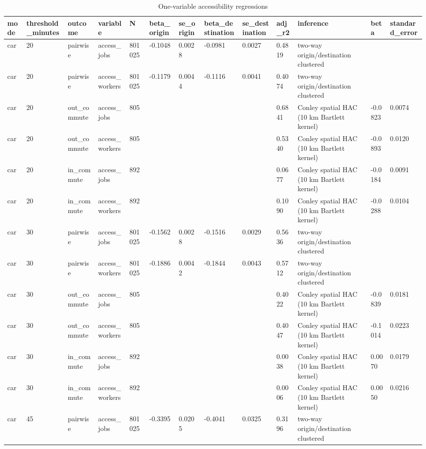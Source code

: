 \begin{table}[htbp]
\centering
\scriptsize
\caption{One-variable accessibility regressions}
\label{tab:onevar}
\begin{tabular}{lllllllllllll}
\toprule
mode & threshold\_minutes & outcome & variable & N & beta\_origin & se\_origin & beta\_destination & se\_destination & adj\_r2 & inference & beta & standard\_error \\
\midrule
car & 20 & pairwise & access\_jobs & 801025 & -0.1048 & 0.0028 & -0.0981 & 0.0027 & 0.4819 & two-way origin/destination clustered &  &  \\
car & 20 & pairwise & access\_workers & 801025 & -0.1179 & 0.0044 & -0.1116 & 0.0041 & 0.4074 & two-way origin/destination clustered &  &  \\
car & 20 & out\_commute & access\_jobs & 805 &  &  &  &  & 0.6841 & Conley spatial HAC (10 km Bartlett kernel) & -0.0823 & 0.0074 \\
car & 20 & out\_commute & access\_workers & 805 &  &  &  &  & 0.5340 & Conley spatial HAC (10 km Bartlett kernel) & -0.0893 & 0.0120 \\
car & 20 & in\_commute & access\_jobs & 892 &  &  &  &  & 0.0677 & Conley spatial HAC (10 km Bartlett kernel) & -0.0184 & 0.0091 \\
car & 20 & in\_commute & access\_workers & 892 &  &  &  &  & 0.1090 & Conley spatial HAC (10 km Bartlett kernel) & -0.0288 & 0.0104 \\
car & 30 & pairwise & access\_jobs & 801025 & -0.1562 & 0.0028 & -0.1516 & 0.0029 & 0.5636 & two-way origin/destination clustered &  &  \\
car & 30 & pairwise & access\_workers & 801025 & -0.1886 & 0.0042 & -0.1844 & 0.0043 & 0.5712 & two-way origin/destination clustered &  &  \\
car & 30 & out\_commute & access\_jobs & 805 &  &  &  &  & 0.4022 & Conley spatial HAC (10 km Bartlett kernel) & -0.0839 & 0.0181 \\
car & 30 & out\_commute & access\_workers & 805 &  &  &  &  & 0.4047 & Conley spatial HAC (10 km Bartlett kernel) & -0.1014 & 0.0223 \\
car & 30 & in\_commute & access\_jobs & 892 &  &  &  &  & 0.0038 & Conley spatial HAC (10 km Bartlett kernel) & 0.0070 & 0.0179 \\
car & 30 & in\_commute & access\_workers & 892 &  &  &  &  & 0.0006 & Conley spatial HAC (10 km Bartlett kernel) & 0.0050 & 0.0216 \\
car & 45 & pairwise & access\_jobs & 801025 & -0.3395 & 0.0205 & -0.4041 & 0.0325 & 0.3196 & two-way origin/destination clustered &  &  \\

\end{tabular}
\end{table}

